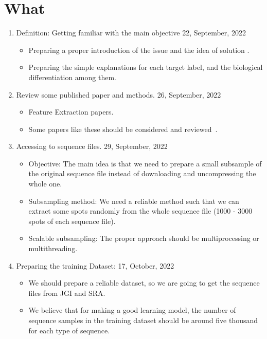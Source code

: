 \documentclass[a4paper]{article}
\newcommand{\deadline}[1]{{\color{blue} \hfill{#1} }}
\begin{document}
    \section{What}\label{sec:what}
    \begin{enumerate}
        \item Definition: Getting familiar with the main objective \deadline{22, September, 2022}
        \begin{itemize}
            \item Preparing a proper introduction of the issue and the idea of solution .
            \item Preparing the simple explanations for each target label, and the biological differentiation among them.
        \end{itemize}
        \item Review some published paper and methods. \deadline{26, September, 2022}
        \begin{itemize}
            \item Feature Extraction papers.
            \item Some papers like these should be considered and reviewed~\cite[]{RF102}.
        \end{itemize}
        \item Accessing to sequence files.  \deadline{29, September, 2022}
        \begin{itemize}
            \item Objective: The main idea is that we need to prepare a small subsample of the original sequence file instead of downloading and uncompressing the whole one.
            \item Subsampling method: We need a reliable method such that we can extract some spots randomly from the whole sequence file (1000 - 3000 spots of each sequence file).
            \item Scalable subsampling: The proper approach should be multiprocessing or multithreading.
        \end{itemize}
        \item Preparing the training Dataset:\deadline{17, October, 2022}
        \begin{itemize}
            \item We should prepare a reliable dataset, so we are going to get the sequence files from JGI and SRA.\@
            \item We believe that for making a good learning model, the number of sequence samples in the training dataset should be around five thousand for each type of sequence.

\end{itemize}
\end{enumerate}
\end{document}

